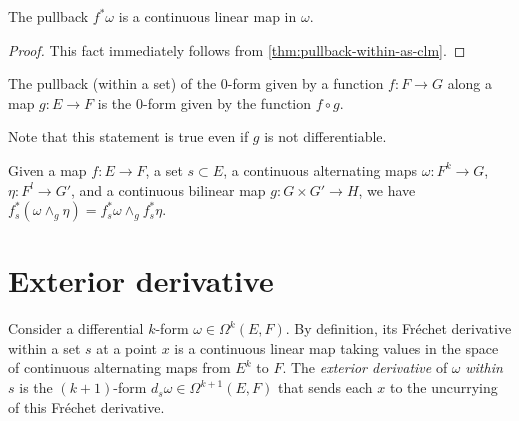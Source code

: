 \begin{theorem}%
  \label{thm:pullback-as-clm}
  The pullback \(f^{*}\omega\) is a continuous linear map in \(\omega\).
\end{theorem}

\begin{proof}
  This fact immediately follows from \autoref{thm:pullback-within-as-clm}.
\end{proof}

\begin{lemma}%
  \label{lem:pullback-within-mk0}
  The pullback (within a set) of the \(0\)-form given by a function \(f\colon F\to G\) along a map \(g\colon E\to F\)
  is the \(0\)-form given by the function \(f\circ g\).

  Note that this statement is true even if \(g\) is not differentiable.
\end{lemma}


\begin{lemma}%
  \label{lem:pullback-within-wedge}
  Given a map \(f\colon E\to F\), a set \(s \subset E\), a continuous alternating maps \(\omega\colon F^{k}\to G\), \(\eta\colon F^{l}\to G'\), and a continuous bilinear map \(g\colon G\times G' \to H\),
  we have \(f_{s}^{*}(\omega \wedge_{g}\eta) = f_{s}^{*}\omega\wedge_{g}f_{s}^{*}\eta\).
\end{lemma}

\section{Exterior derivative}%
\label{sec:exterior-derivative}

\begin{definition}%
  \label{def:ederivWithin}
  Consider a differential \(k\)-form \(\omega \in \Omega^{k}(E, F)\).
  By definition, its Fréchet derivative within a set \(s\) at a point \(x\)
  is a continuous linear map taking values in the space of continuous alternating maps from \(E^{k}\) to \(F\).
  The \emph{exterior derivative} of \(\omega\) \emph{within} \(s\) is the \((k + 1)\)-form \(d_{s}\omega\in\Omega^{k + 1}(E, F)\)
  that sends each \(x\) to the uncurrying of this Fréchet derivative.
\end{definition}

